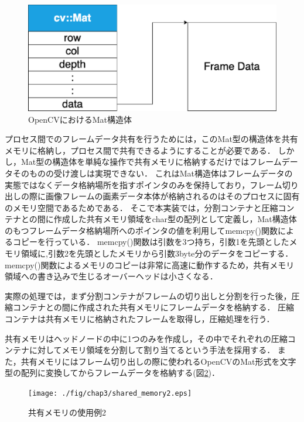 \begin{figure}[H]
    \hspace*{\fill}
    \includegraphics[width=120mm]{./fig/chap3/mat.eps}
    \hspace*{\fill}
    \caption{OpenCVにおけるMat構造体}
    \label{mat}
\end{figure}

プロセス間でのフレームデータ共有を行うためには，このMat型の構造体を共有メモリに格納し，プロセス間で共有できるようにすることが必要である．
しかし，Mat型の構造体を単純な操作で共有メモリに格納するだけではフレームデータそのものの受け渡しは実現できない．
これはMat構造体はフレームデータの実態ではなくデータ格納場所を指すポインタのみを保持しており，フレーム切り出しの際に画像フレームの画素データ本体が格納されるのはそのプロセスに固有のメモリ空間であるためである．
そこで本実装では，分割コンテナと圧縮コンテナとの間に作成した共有メモリ領域をchar型の配列として定義し，Mat構造体のもつフレームデータ格納場所へのポインタの値を利用してmemcpy()関数によるコピーを行っている．
memcpy()関数は引数を3つ持ち，引数1を先頭としたメモリ領域に,引数2を先頭としたメモリから引数3byte分のデータをコピーする．
memcpy()関数によるメモリのコピーは非常に高速に動作するため，共有メモリ領域への書き込みで生じるオーバーヘッドは小さくなる．

実際の処理では，まず分割コンテナがフレームの切り出しと分割を行った後，圧縮コンテナとの間に作成された共有メモリにフレームデータを格納する．
圧縮コンテナは共有メモリに格納されたフレームを取得し，圧縮処理を行う．

共有メモリはヘッドノードの中に1つのみを作成し，その中でそれぞれの圧縮コンテナに対してメモリ領域を分割して割り当てるという手法を採用する．
また，共有メモリにはフレーム切り出しの際に使われるOpenCVのMat形式を文字型の配列に変換してからフレームデータを格納する(図\ref{shared_memory2})．

\begin{figure}[H]
    \hspace*{\fill}
    \texttt{[image: ./fig/chap3/shared\_memory2.eps]}
    \hspace*{\fill}
    \caption{共有メモリの使用例2}
    \label{shared_memory2}
\end{figure}

